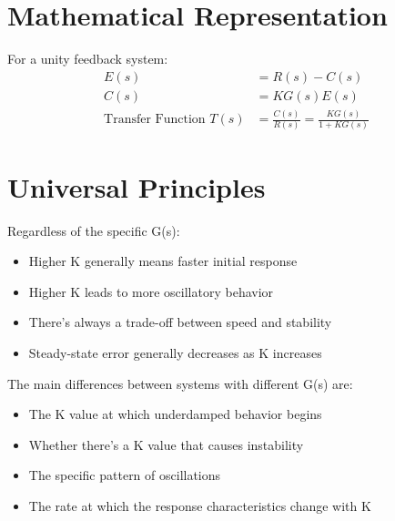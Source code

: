 \documentclass{article}
\begin{document}
\section{Mathematical Representation}
For a unity feedback system:
\begin{align*}
    E(s) &= R(s) - C(s) \\
    C(s) &= KG(s)E(s) \\
    \text{Transfer Function } T(s) &= \frac{C(s)}{R(s)} = \frac{KG(s)}{1 + KG(s)}
\end{align*}

\section{Universal Principles}
Regardless of the specific G(s):
\begin{itemize}
    \item Higher K generally means faster initial response
    \item Higher K leads to more oscillatory behavior
    \item There's always a trade-off between speed and stability
    \item Steady-state error generally decreases as K increases
\end{itemize}

The main differences between systems with different G(s) are:
\begin{itemize}
    \item The K value at which underdamped behavior begins
    \item Whether there's a K value that causes instability
    \item The specific pattern of oscillations
    \item The rate at which the response characteristics change with K
\end{itemize}
\end{document}
